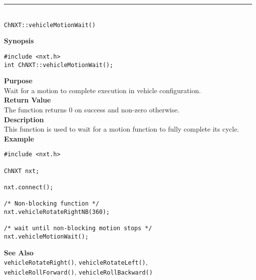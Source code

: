 \noindent
\vspace{5pt}
\rule{4.5in}{0.015in}\\
\noindent
{\LARGE \texttt{ChNXT::vehicleMotionWait()}}\\
{}

\noindent
{\bf Synopsis}
\begin{lstlisting}
#include <nxt.h>
int ChNXT::vehicleMotionWait();
\end{lstlisting}

\noindent
{\bf Purpose}\\
Wait for a motion to complete execution in vehicle configuration.\\

\noindent
{\bf Return Value}\\
The function returns 0 on success and non-zero otherwise.\\

\noindent
{\bf Description}\\
This function is used to wait for a motion function to fully complete its cycle.\\


\noindent
{\bf Example}
\begin{lstlisting}
#include <nxt.h>

ChNXT nxt;

nxt.connect();

/* Non-blocking function */
nxt.vehicleRotateRightNB(360);

/* wait until non-blocking motion stops */
nxt.vehicleMotionWait();
\end{lstlisting}

\noindent
{\bf See Also}\\
\texttt{vehicleRotateRight()}, \texttt{vehicleRotateLeft()}, \\
\texttt{vehicleRollForward()}, \texttt{vehicleRollBackward()}



